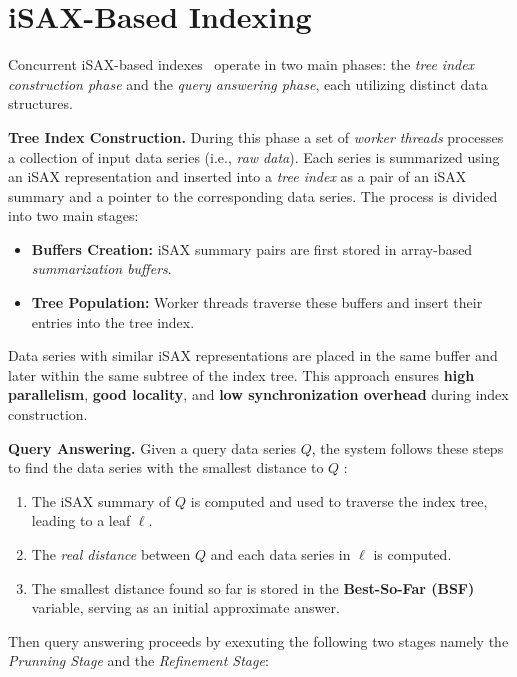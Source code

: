 \section{iSAX-Based Indexing}

Concurrent iSAX-based indexes~\cite{peng2018paris,parisplus,peng2020messi,  
PFP21-I,PFP21-II} operate in two main phases:  
the \textit{tree index construction phase} and the \textit{query answering phase},  
each utilizing distinct data structures. 

\noindent\textbf{Tree Index Construction.} During this phase a set of \textit{worker threads}  
processes a collection of input data series (i.e., \textit{raw data}).  
Each series is summarized using an iSAX representation and inserted into a 
\textit{tree index} as a pair of an iSAX summary and a pointer to the corresponding 
data series.  
% 
The process is divided into two main stages:
\begin{itemize} [noitemsep, topsep=3pt, partopsep=0pt, parsep=0pt]
    \item \textbf{Buffers Creation:} iSAX summary pairs are first stored in array-based  
    \textit{summarization buffers}.  
    \item \textbf{Tree Population:} Worker threads traverse these buffers and insert 
    their entries into the tree index.  
\end{itemize}  
Data series with similar iSAX representations are placed in the same buffer and later  
within the same subtree of the index tree.  
This approach ensures \textbf{high parallelism}, \textbf{good locality}, and  
\textbf{low synchronization overhead} during index construction.

\noindent\textbf{Query Answering.}  
Given a query data series \( Q \), the system follows these steps
to find the data series with the smallest distance to \( Q \) :  
\vspace{-5pt} %
\begin{enumerate}[noitemsep, topsep=1pt, partopsep=0pt, parsep=0pt]
    \item The iSAX summary of \( Q \) is computed and used to traverse the index tree,  
    leading to a leaf \( \ell \).  
    \item The \textit{real distance} between \( Q \) and each data series in \( \ell \) is computed.  
    \item The smallest distance found so far is stored in the \textbf{Best-So-Far (BSF)} variable,  
    serving as an initial approximate answer.  
\end{enumerate}  
% 
Then query answering proceeds by exexuting the following two stages
namely the \textit{Prunning Stage} and the \textit{Refinement Stage}:

